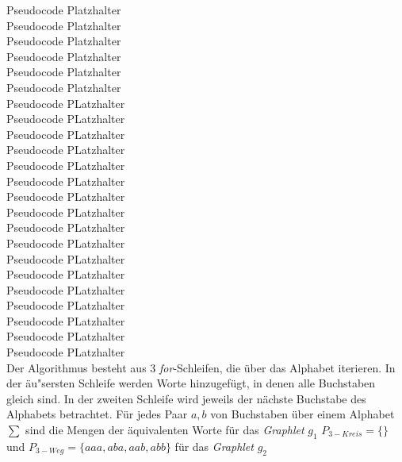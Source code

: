 \documentclass{report}
\begin{document}
%
%

Pseudocode Platzhalter \\
Pseudocode Platzhalter \\
Pseudocode Platzhalter \\
Pseudocode Platzhalter \\
Pseudocode Platzhalter \\
Pseudocode Platzhalter \\
Pseudocode PLatzhalter \\
Pseudocode PLatzhalter \\
Pseudocode PLatzhalter \\
Pseudocode PLatzhalter \\
Pseudocode PLatzhalter \\
Pseudocode PLatzhalter \\
Pseudocode PLatzhalter \\
Pseudocode PLatzhalter \\
Pseudocode PLatzhalter \\
Pseudocode PLatzhalter \\
Pseudocode PLatzhalter \\
Pseudocode PLatzhalter \\
Pseudocode PLatzhalter \\
Pseudocode PLatzhalter \\
Pseudocode PLatzhalter \\
Pseudocode PLatzhalter \\
Pseudocode PLatzhalter \\


Der Algorithmus besteht aus 3 \textit{for}-Schleifen, die \"uber das Alphabet iterieren. In der \"au"sersten Schleife werden Worte hinzugef\"ugt, in denen alle Buchstaben gleich sind.
In der zweiten Schleife wird jeweils der n\"achste Buchstabe des Alphabets betrachtet. F\"ur jedes Paar $a, b$ von Buchstaben \"uber einem Alphabet $\sum$ sind die Mengen der \"aquivalenten Worte f\"ur das \textit{Graphlet} $g_1$ $P_{3-Kreis} = \{ \}$ und $P_{3-Weg} = \{ aaa, aba, aab, abb  \}$ f\"ur das \textit{Graphlet} $g_2$
\end{document}
